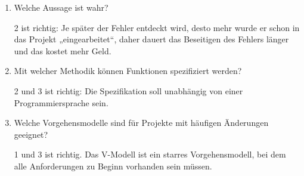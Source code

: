 \documentclass{lehramt-informatik-minimal}
\begin{document}
\begin{enumerate}


\item Welche Aussage ist wahr?


\begin{antwort}
2 ist richtig: Je später der Fehler entdeckt wird, desto mehr wurde er
schon in das Projekt „eingearbeitet“, daher dauert das Beseitigen des
Fehlers länger und das kostet mehr Geld.
\end{antwort}


\item  Mit welcher Methodik können Funktionen spezifiziert werden?


\begin{antwort}
2 und 3 ist richtig: Die Spezifikation soll unabhängig von einer
Programmiersprache sein.
\end{antwort}


\item Welche Vorgehensmodelle sind für Projekte mit häufigen Änderungen
geeignet?


\begin{antwort}
1 und 3 ist richtig. Das V-Modell ist ein starres Vorgehensmodell, bei
dem alle Anforderungen zu Beginn vorhanden sein müssen.
\end{antwort}


\end{enumerate}
\end{document}
